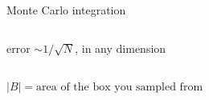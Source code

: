 \documentclass[aspectratio=169]{beamer}
\newcommand{\cbox}[2]{\colorbox{#1}{\ensuremath{\displaystyle #2}}}
\begin{document}
\begin{frame}{Monte Carlo integration}
\begin{columns}[T]
\begin{column}{0.58\textwidth}
\vspace{0.8em}
\footnotesize
error $\sim 1/\sqrt{N}$, in any dimension
\end{column}
\end{columns}

\vspace{0.6em}
\centering
\cbox{hl!12}{|B| = \text{area of the box you sampled from}}
\end{frame}
\end{document}
